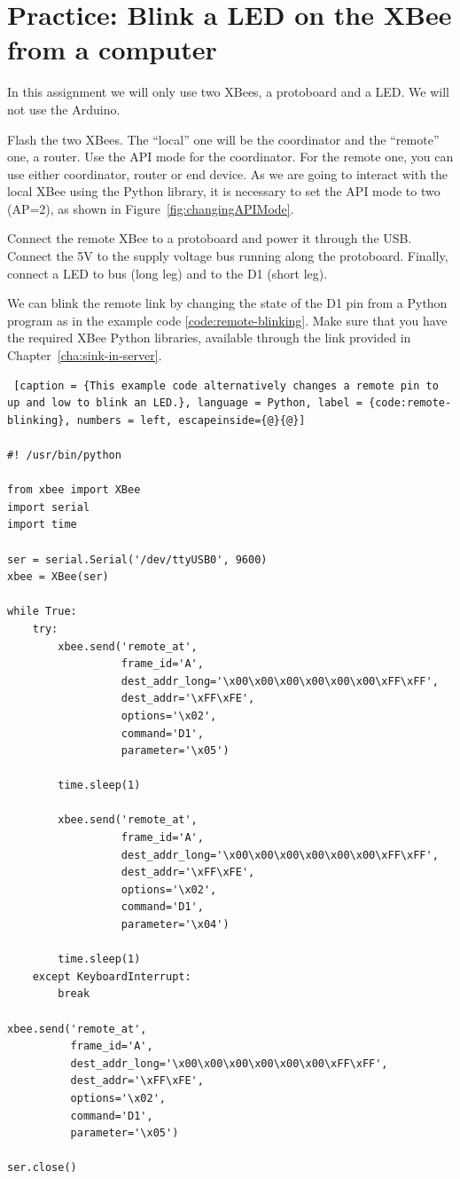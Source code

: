 \chapter{Practice: Blink a LED on the XBee from a computer}

In this assignment we will only use two XBees, a protoboard and a LED.
We will not use the Arduino.

Flash the two XBees.
The ``local'' one will be the coordinator and the ``remote'' one, a router.
Use the API mode for the coordinator.
For the remote one, you can use either coordinator, router or end device.
As we are going to interact with the local XBee using the Python library, it is necessary to set the API mode to two (AP=2), as shown in Figure~\ref{fig:changingAPIMode}.

Connect the remote XBee to a protoboard and power it through the USB.
Connect the 5V to the supply voltage bus running along the protoboard.
Finally, connect a LED to bus (long leg) and to the D1 (short leg).

We can blink the remote link by changing the state of the D1 pin from a Python program as in the example code \ref{code:remote-blinking}. Make sure that you have the required XBee Python libraries, available through the link provided in Chapter~\ref{cha:sink-in-server}.\\

\begin{lstlisting} [caption = {This example code alternatively changes a remote pin to up and low to blink an LED.}, language = Python, label = {code:remote-blinking}, numbers = left, escapeinside={@}{@}]

#! /usr/bin/python

from xbee import XBee
import serial
import time

ser = serial.Serial('/dev/ttyUSB0', 9600)
xbee = XBee(ser)

while True:
    try:
        xbee.send('remote_at', 
                  frame_id='A',
                  dest_addr_long='\x00\x00\x00\x00\x00\x00\xFF\xFF',
                  dest_addr='\xFF\xFE',
                  options='\x02',
                  command='D1',
                  parameter='\x05')
          
        time.sleep(1)
        
        xbee.send('remote_at', 
                  frame_id='A',
                  dest_addr_long='\x00\x00\x00\x00\x00\x00\xFF\xFF',
                  dest_addr='\xFF\xFE',
                  options='\x02',
                  command='D1',
                  parameter='\x04')
          
        time.sleep(1)
    except KeyboardInterrupt:
        break

xbee.send('remote_at', 
          frame_id='A',
          dest_addr_long='\x00\x00\x00\x00\x00\x00\xFF\xFF',
          dest_addr='\xFF\xFE',
          options='\x02',
          command='D1',
          parameter='\x05')

ser.close()


\end{lstlisting}

